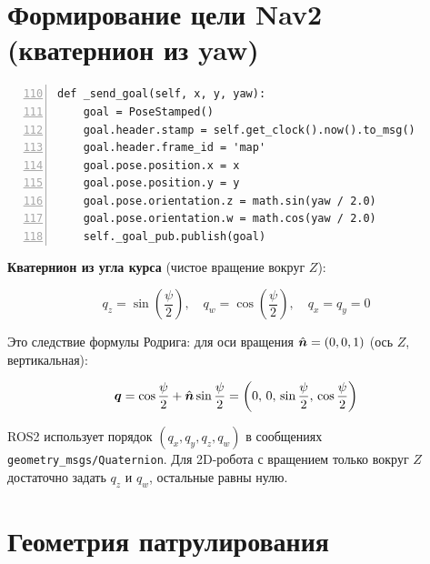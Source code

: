 \section{Формирование цели Nav2 (кватернион из yaw)}

\begin{filebox}[title={\filepath{patrol\_node.py}, строки 110--118 --- \_send\_goal()}]
\begin{lstlisting}[style=pythonstyle, numbers=left, firstnumber=110]
def _send_goal(self, x, y, yaw):
    goal = PoseStamped()
    goal.header.stamp = self.get_clock().now().to_msg()
    goal.header.frame_id = 'map'
    goal.pose.position.x = x
    goal.pose.position.y = y
    goal.pose.orientation.z = math.sin(yaw / 2.0)
    goal.pose.orientation.w = math.cos(yaw / 2.0)
    self._goal_pub.publish(goal)
\end{lstlisting}
\end{filebox}

\textbf{Кватернион из угла курса} (чистое вращение вокруг $Z$):

\begin{equation}
  \boxed{
  q_z = \sin\!\left(\frac{\psi}{2}\right), \quad
  q_w = \cos\!\left(\frac{\psi}{2}\right), \quad
  q_x = q_y = 0
  }
  \label{eq:yaw_to_quat}
\end{equation}

Это следствие формулы Родрига: для оси вращения $\hat{\bm{n}} = (0, 0, 1)$
(ось $Z$, вертикальная):

\begin{equation}
  \bm{q} = \cos\frac{\psi}{2} + \hat{\bm{n}}\sin\frac{\psi}{2}
  = \left(0,\, 0,\, \sin\frac{\psi}{2},\, \cos\frac{\psi}{2}\right)
  \label{eq:rodriguez_z}
\end{equation}

\begin{notebox}
ROS2 использует порядок $(q_x, q_y, q_z, q_w)$ в сообщениях
\texttt{geometry\_msgs/Quaternion}. Для 2D-робота с вращением только
вокруг $Z$ достаточно задать $q_z$ и $q_w$, остальные равны нулю.
\end{notebox}

\section{Геометрия патрулирования}

